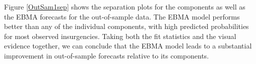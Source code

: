 \documentclass[pdftex,12pt,fullpage,oneside]{amsart}
\begin{document}

Figure \ref{OutSam1sep} shows the separation plots for the components
as well as the EBMA forecasts for the out-of-sample data.  The EBMA
model performs better than any of the individual components, with high
predicted probabilities for most observed insurgencies.  Taking
both the fit statistics and the visual evidence together, we can
conclude that the EBMA model leads to a substantial improvement in
out-of-sample forecasts relative to its components.
\end{document}
